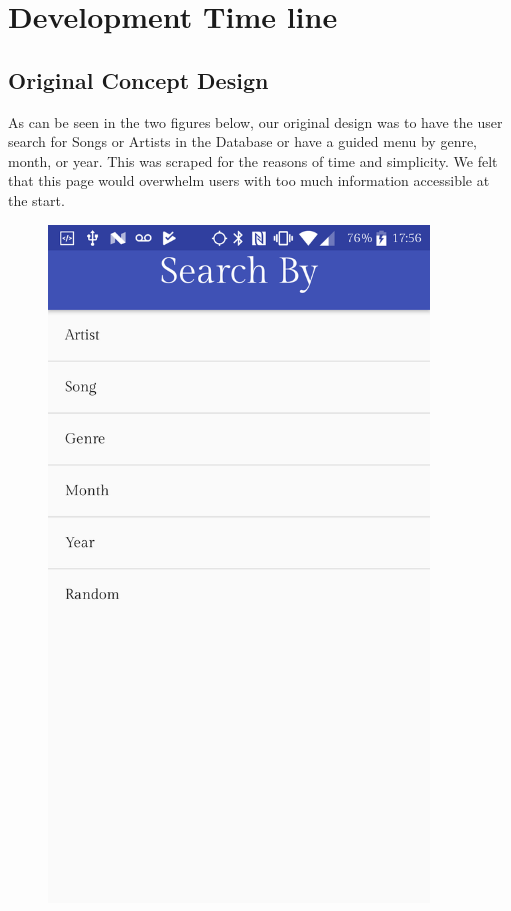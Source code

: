 \documentclass{article}
\begin{document}
\section*{Development Time line}
\subsection*{Original Concept Design}
As can be seen in the two figures below, our original design was to have the user search for Songs or Artists in the Database or have a guided menu by genre, month, or year. This was scraped for the reasons of time and simplicity. We felt that this page would overwhelm users with too much information accessible at the start. 
\begin{figure}[H]
  \centering
  \begin{minipage}{.5\textwidth}
    \centering
    \includegraphics[width=0.9\textwidth]{Original_Home_Page.png}

\end{minipage}
\end{figure}
\end{document}
